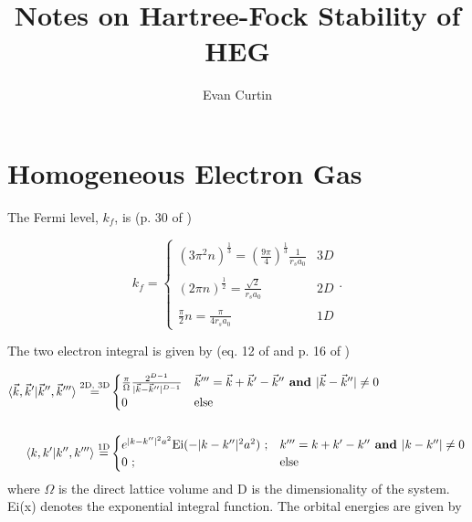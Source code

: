 \documentclass{revtex4}
\begin{document}
\title{Notes on Hartree-Fock Stability of HEG}
\author{Evan Curtin}
\maketitle


\section{Homogeneous Electron Gas}

The Fermi level, $k_f$, is (p. 30 of \cite{Guiliani2005})

\begin{equation}
k_f
=\begin{cases} 
      (3\pi^2n)^{\frac{1}{3}} = \left(\frac{9\pi}{4}\right)^{\frac{1}{3}}\frac{1}{r_sa_0} & 3D \\ \\
      (2\pi n)^{\frac{1}{2}} = \frac{\sqrt{2}}{r_sa_0}  & 2D \\
      \\
      \frac{\pi}{2}n = \frac{\pi}{4 r_s a_0}   & 1D 
   \end{cases}
   .
\end{equation}

The two electron integral is given by (eq. 12 of \cite{Delyon2008} and p. 16 of \cite{Guiliani2005})

\begin{subequations}
\begin{align}
\braket{\vec{k}, \vec{k}'|\vec{k}'',\vec{k}'''}\stackrel{\text{2D, 3D}}{=}&
	\begin{cases} 
	\frac{\pi}{\Omega}\frac{2^{D-1}}{|\vec{k}-\vec{k}''|^{D-1}} 
	& \vec{k}''' = \vec{k}+\vec{k}'-\vec{k}'' \textbf{ and } |\vec{k}-\vec{k}''| \neq 0 \\
	0 
	& \text{else}
	\end{cases}
\\ \nonumber \\
\braket{k, k'|k'',k'''}\stackrel{\text{1D}}{=}&
	\begin{cases} 
	e^{|k-k''|^2a^2}\text{Ei}(-|k-k''|^2a^2)\text{ ;}
	& k''' = k+k'-k'' \textbf{ and } |k-k''| \neq 0 \\
	0\text{ ;} 
	& \text{else}
	\end{cases}
\end{align}
\end{subequations}
where $\Omega$ is the direct lattice volume and D is the dimensionality of the system. Ei(x) denotes the exponential integral function. The orbital energies are given by 
\end{document}
